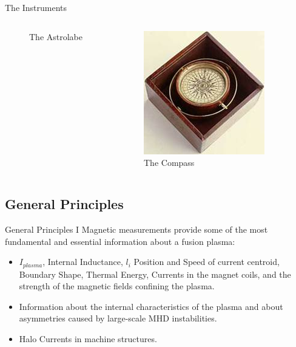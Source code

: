 \documentclass{beamer}
\begin{document}
\begin{frame}{The Instruments}
\begin{columns}
\begin{figure}[ht]
\begin{center}
	\caption{\tiny The Astrolabe}
	\end{center}
	\end{figure}
   {
 	\begin{figure}[ht]
	\begin{center}
	\includegraphics[width=0.9 \columnwidth]{Compass.jpg}
	\caption{\tiny The Compass}
	\end{center}
	\end{figure}
}
\end{columns}
\end{frame}
	
\subsection{General Principles}

\begin{frame}{General Principles I}%
    Magnetic measurements provide some of the most   \alert{fundamental} and %
\alert{essential} information about a fusion plasma:

  \begin{itemize}
  \item<2->
    $I_{plasma}$, Internal Inductance, $l_i$  Position and Speed of current centroid, 
	Boundary Shape, Thermal Energy, Currents in the magnet coils, 
	and the strength of the magnetic fields confining the plasma.
%
  \item<3->
    Information about the internal characteristics of the plasma and 
	about asymmetries caused by large-scale MHD instabilities.
  \item<4-> Halo Currents in machine structures.
  \end{itemize}
\end{frame}
\end{document}

